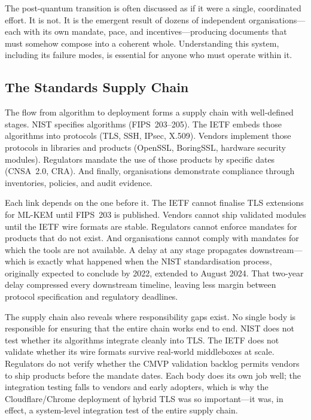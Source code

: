 The post-quantum transition is often discussed as if it were a single, coordinated effort. It is not. It is the emergent result of dozens of independent organisations---each with its own mandate, pace, and incentives---producing documents that must somehow compose into a coherent whole. Understanding this system, including its failure modes, is essential for anyone who must operate within it.

\subsection{The Standards Supply Chain}
\label{subsec:supply-chain}

The flow from algorithm to deployment forms a supply chain with well-defined stages. NIST specifies algorithms (FIPS~203--205). The IETF embeds those algorithms into protocols (TLS, SSH, IPsec, X.509). Vendors implement those protocols in libraries and products (OpenSSL, BoringSSL, hardware security modules). Regulators mandate the use of those products by specific dates (CNSA~2.0, CRA). And finally, organisations demonstrate compliance through inventories, policies, and audit evidence.

Each link depends on the one before it. The IETF cannot finalise TLS extensions for ML-KEM until FIPS~203 is published. Vendors cannot ship validated modules until the IETF wire formats are stable. Regulators cannot enforce mandates for products that do not exist. And organisations cannot comply with mandates for which the tools are not available. A delay at any stage propagates downstream---which is exactly what happened when the NIST standardisation process, originally expected to conclude by 2022, extended to August 2024. That two-year delay compressed every downstream timeline, leaving less margin between protocol specification and regulatory deadlines.

The supply chain also reveals where responsibility gaps exist. No single body is responsible for ensuring that the entire chain works end to end. NIST does not test whether its algorithms integrate cleanly into TLS. The IETF does not validate whether its wire formats survive real-world middleboxes at scale. Regulators do not verify whether the CMVP validation backlog permits vendors to ship products before the mandate dates. Each body does its own job well; the integration testing falls to vendors and early adopters, which is why the Cloudflare/Chrome deployment of hybrid TLS was so important---it was, in effect, a system-level integration test of the entire supply chain.

